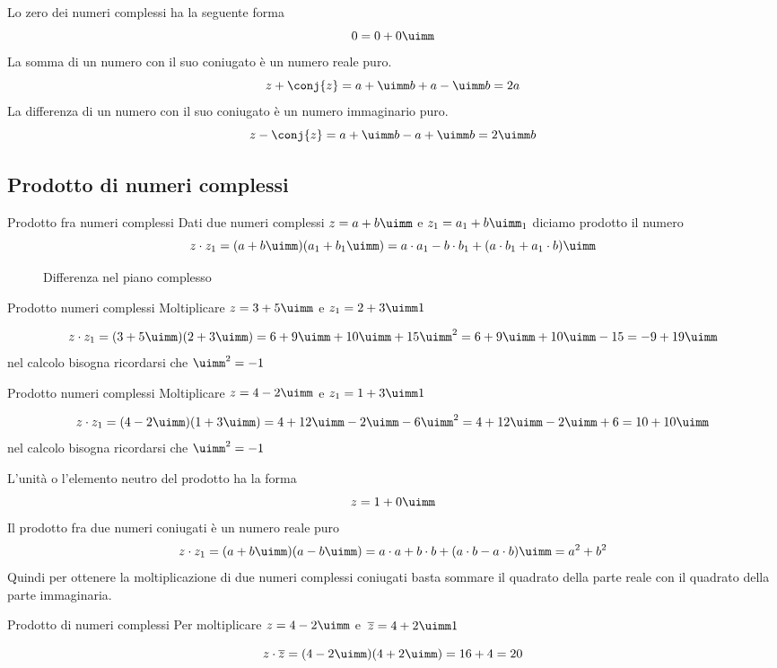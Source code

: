 Lo zero dei numeri complessi ha la seguente forma
\[0=0+0\uimm\]
La somma di un numero con il suo coniugato è un numero reale puro. \[z+\conj{z}=a+\uimm b+a-\uimm b=2a \] 
La differenza di un numero con il suo coniugato è un numero immaginario puro. \[z-\conj{z}=a+\uimm b-a+\uimm b=2\uimm b \] 

\subsection{Prodotto di numeri complessi}
\begin{definizionet}{Prodotto fra numeri complessi}{}
	Dati due numeri complessi  $z=a+b\uimm $ e  $z_1=a_1+b\uimm _1$ diciamo prodotto il numero \[z\cdot z_1=(a+b\uimm)(a_1+b_1\uimm)=a\cdot a_1-b\cdot b_1+(a\cdot b_1+a_1\cdot b)\uimm\]
\end{definizionet}
\begin{figure}
	\centering
	
	\caption{Differenza nel piano complesso}
	\label{fig:DifferenzaPianoComplesso}
\end{figure}
\begin{esempiot}{Prodotto numeri complessi}{}
	Moltiplicare $z=3+5\uimm $ e  $z_1=2+3\uimm1$ 
\end{esempiot}	
	 \[z\cdot z_1=(3+5\uimm)(2+3\uimm)= 6+9\uimm +10\uimm +15\uimm^2=6+9\uimm +10\uimm -15 =-9+19\uimm \]
	nel calcolo bisogna ricordarsi che $\uimm^2=-1$
\begin{esempiot}{Prodotto numeri complessi}{}
	Moltiplicare $z=4-2\uimm $ e  $z_1=1+3\uimm1$  
\end{esempiot}	
	\[z\cdot z_1=(4-2\uimm)(1+3\uimm)= 4+12\uimm -2\uimm -6\uimm^2= 4+12\uimm -2\uimm +6=10+10\uimm \]
	nel calcolo bisogna ricordarsi che $\uimm^2=-1$

L'unità o l'elemento neutro del prodotto ha la forma\[z=1+0\uimm\] 
Il prodotto fra due numeri coniugati  è un numero reale puro
\[z\cdot z_1=(a+b\uimm)(a-b\uimm)=a\cdot a+b\cdot b+(a\cdot b-a\cdot b)\uimm=a^2+b^2\]
Quindi per ottenere la moltiplicazione di due numeri complessi coniugati basta sommare il quadrato della parte reale con il quadrato della parte immaginaria.
\begin{esempiot}{Prodotto di numeri complessi}{}
	Per moltiplicare $z=4-2\uimm $ e\  $\overline{z}=4+2\uimm1$  
\end{esempiot}	
	\[z\cdot \overline{z}=(4-2\uimm)(4+2\uimm)= 16+4=20\]
